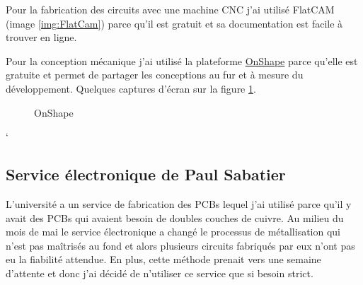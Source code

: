 \documentclass[12pt]{article}
\begin{document}
\begin{par}
	Pour la fabrication des circuits avec une machine CNC j'ai
	utilisé FlatCAM (image \ref{img:FlatCam}) parce qu'il est gratuit et sa documentation
	est facile à trouver en ligne.
\end{par}
\begin{par}
	Pour la conception mécanique j'ai utilisé la plateforme \href{https:/www.onshapecom/}{OnShape} parce qu'elle est gratuite et permet de partager les conceptions au fur et à mesure du développement. Quelques captures d'écran sur la figure \ref{img:onshape_all}.
\end{par}
\begin{figure}[!htb]
	\centering
	\caption{OnShape}
	\label{img:onshape_all}
\end{figure}
`%
\subsection{Service électronique de Paul Sabatier}
\begin{par}
L'université a un service de fabrication des PCBs lequel j'ai utilisé parce qu'il y avait des 	PCBs qui avaient besoin de doubles couches de cuivre. Au milieu du mois de mai le service électronique a 	changé le processus de métallisation qui n'est pas 	maîtrisés au fond et alors plusieurs 	circuits fabriqués par eux n'ont pas eu la fiabilité attendue. En plus, cette méthode prenait vers une semaine d'attente et donc j'ai décidé de n'utiliser ce service que si besoin strict.
\end{par}
\end{document}
